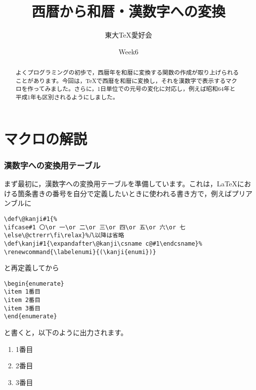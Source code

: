 \documentclass[autodetect-engine,dvipdfmx]{jsarticle}
\title{西暦から和暦・漢数字への変換}
\author{東大TeX愛好会}
\date{Week6}
\begin{document}
\maketitle

\begin{abstract}
よくプログラミングの初歩で，西暦年を和暦に変換する関数の作成が取り上げられることがあります。今回は，\TeX で西暦を和暦に変換し，それを漢数字で表示するマクロを作ってみました。さらに，1日単位での元号の変化に対応し，例えば昭和64年と平成1年も区別されるようにしました。
\end{abstract}

\part{マクロの解説}

\section{漢数字への変換用テーブル}

まず最初に，漢数字への変換用テーブルを準備しています。これは，\LaTeX における箇条書きの番号を自分で定義したいときに使われる書き方で，例えばプリアンブルに

\begin{tcolorbox}

\begin{verbatim}
\def\@kanji#1{%
\ifcase#1 〇\or 一\or 二\or 三\or 四\or 五\or 六\or 七 \else\@ctrerr\fi\relax}%八以降は省略
\def\kanji#1{\expandafter\@kanji\csname c@#1\endcsname}%
\renewcommand{\labelenumi}{(\kanji{enumi})}
\end{verbatim}

\end{tcolorbox}

と再定義してから

\begin{tcolorbox}

\begin{verbatim}
\begin{enumerate}
\item 1番目
\item 2番目
\item 3番目
\end{enumerate}
\end{verbatim}

\end{tcolorbox}

と書くと，以下のように出力されます。

\begin{tcolorbox}
\makeatletter
\def\@kanji#1{%
\ifcase#1 〇\or 一\or 二\or 三\or 四\or 五\or 六\or 七 \else\@ctrerr\fi\relax}%
\def\kanji#1{\expandafter\@kanji\csname c@#1\endcsname}%
\renewcommand{\labelenumi}{(\kanji{enumi})}
\begin{enumerate}
\item 1番目
\item 2番目
\item 3番目
\end{enumerate}
\makeatother
\end{tcolorbox}
\end{document}
